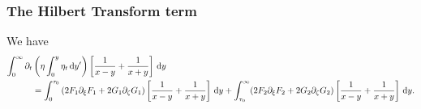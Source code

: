 \documentclass[10pt,reqno,oneside,a4paper, landscape]{article}
\begin{document}
\subsubsection{The Hilbert Transform term}
\begin{prop}\label{HTtransformed}
We have 
\begin{align*}
\int_0^\infty \partial_t &\left( \eta \int^{y}_0\eta_{t} \,\mathrm{d} y' \right) \left[ \frac{1}{x-y} + \frac{1}{x+y} \right] \,\mathrm{d} y \\
&=  \int_0^{\tau_0} \left( 2 F_1  \partial_\xi F_1 + 2 G_1 \partial_\zeta G_1 \right) \left[ \frac{1}{x-y} + \frac{1}{x+y} \right] \,\mathrm{d} y +\int_{\tau_0}^\infty (2 F_2 \partial_\xi F_2 + 2 G_2 \partial_\zeta G_2 )\left[ \frac{1}{x-y} + \frac{1}{x+y} \right] \,\mathrm{d} y.
\end{align*}
\end{prop}
\end{document}
